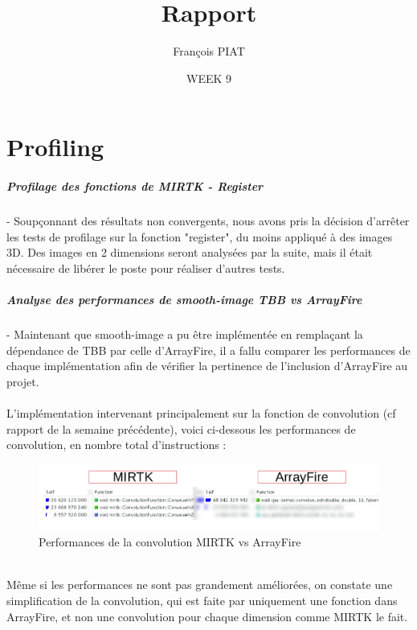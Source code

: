 \documentclass{report}
\title{Rapport}
\author{François PIAT}
\date{WEEK 9}
\begin{document}
\maketitle

\chapter*{Profiling}
\paragraph{Profilage des fonctions de MIRTK - Register}

- Soupçonnant des résultats non convergents, nous avons pris la décision d'arrêter les tests de profilage sur la fonction "register", du moins appliqué à des images 3D. Des images en 2 dimensions seront analysées par la suite, mais il était nécessaire de libérer le poste pour réaliser d'autres tests.\\

\paragraph{Analyse des performances de smooth-image TBB vs ArrayFire}

- Maintenant que smooth-image a pu être implémentée en remplaçant la dépendance de TBB par celle d'ArrayFire, il a fallu comparer les performances de chaque implémentation afin de vérifier la pertinence de l'inclusion d'ArrayFire au projet.\\
\\
L'implémentation intervenant principalement sur la fonction de convolution (cf rapport de la semaine précédente), voici ci-dessous les performances de convolution, en nombre total d'instructions : 
\begin{figure}[h!]
	\begin{center}
		\includegraphics[width=19cm]{figures/MIRTK-AF-smoothimage.png}
	\end{center}	
	\caption{Performances de la convolution MIRTK vs ArrayFire}
	\label{Performances de la convolution MIRTK vs ArrayFire}
\end{figure}
\\Même si les performances ne sont pas grandement améliorées, on constate une simplification de la convolution, qui est faite par uniquement une fonction dans ArrayFire, et non une convolution pour chaque dimension comme MIRTK le fait.
\end{document}
